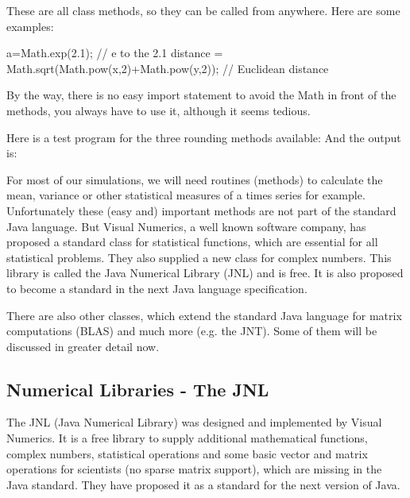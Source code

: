 These are all class methods, so they can be called from anywhere.
Here are some examples:
\begin{sverbatim}
 a=Math.exp(2.1);        // e to the 2.1
 distance = Math.sqrt(Math.pow(x,2)+Math.pow(y,2));  // Euclidean distance
\end{sverbatim} 
By the way, there is no easy import statement to avoid the Math in front
of the methods, you always have to use it, although it seems 
tedious.

Here is a test program for the three rounding methods available:
And the output is:


For most of our simulations, we will need routines (methods) to
calculate the mean, variance or other statistical measures of
a times series for example. Unfortunately
these (easy and) important methods are not part of the
standard Java language. But Visual Numerics, a well known software company,
has proposed a standard class for statistical functions, which are
essential for all statistical problems. They also supplied a new class
for complex numbers. This library is called the Java Numerical Library
(JNL) and is free. It is also proposed to become a standard in the
next Java language specification.

There are also other classes, which extend the standard Java language
for matrix computations (BLAS) and much more (e.g. the JNT). Some of 
them will be discussed in greater detail now.

\subsection{Numerical Libraries - The JNL}
The JNL (Java Numerical Library) was designed and implemented by 
Visual Numerics. It is a free library to supply additional 
mathematical functions, complex numbers, statistical operations 
and some basic vector and matrix operations for scientists (no
sparse matrix support), which
are missing in the Java standard. They have proposed it as a
standard for the next version of Java.


